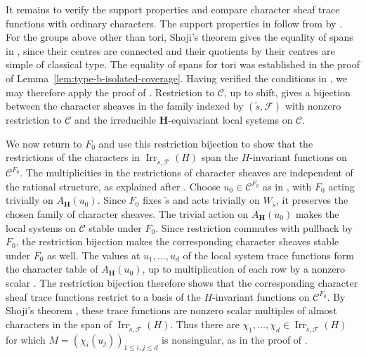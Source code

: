 \documentclass[10pt]{amsart}
\theoremstyle{definition}
\renewcommand{\leq}{\leqslant}
\let\oldendproof\endproof
\renewenvironment{proof}[1][\proofname]{%
  \oldproof[\bfseries #1]%
}{\oldendproof}
\DeclareMathOperator{\Irr}{Irr}
\numberwithin{equation}{section}
\numberwithin{table}{section}
\begin{document}
\begin{proof}[Proof of Lemma~\ref{lem:symplectic-gggr-selection}]
It remains to verify the support properties and compare character sheaf trace
functions with ordinary characters.
The support properties in \cite[(4.3)]{Geck1999GGGR} follow from
\cite[Theorem~10.7]{Lusztig1992Support} by
\cite[Corollary~13.6]{Taylor2016}.
For the groups above other than tori, Shoji's theorem
\cite[Theorem~3.2]{Shoji1995II} gives the equality of spans in
\cite[Theorem~7.1]{Geck1999GGGR}, since their centres are connected and
their quotients by their centres are simple of classical type.
The equality of spans for tori was established in the proof of
Lemma~\ref{lem:type-b-isolated-coverage}.
Having verified the conditions in \cite[(4.4)(a)--(b)]{Geck1999GGGR}, we may
therefore apply the proof of \cite[Theorem~4.5]{Geck1999GGGR}.
Restriction to $\mathcal C$, up to shift, gives a bijection between the
character sheaves in the family indexed by $(\widetilde s,\mathcal F)$
with nonzero restriction to $\mathcal C$ and the irreducible
$\mathbf H$-equivariant local systems on $\mathcal C$.

We now return to $F_0$ and use this restriction bijection to show that the
restrictions of the characters in $\Irr_{\widetilde s,\mathcal F}(H)$ span
the $H$-invariant functions on $\mathcal C^{F_0}$.
The multiplicities in the restrictions of character sheaves are independent
of the rational structure, as explained after
\cite[Theorem~4.5]{Geck1999GGGR}.
Choose $u_0\in\mathcal C^{F_0}$ as in \cite[Proposition~2.4]{Taylor2013},
with $F_0$ acting trivially on $A_{\mathbf H}(u_0)$.
Since $F_0$ fixes $\widetilde s$ and acts trivially on
$W_{\widetilde s}$, it preserves the chosen family of character sheaves.
The trivial action on $A_{\mathbf H}(u_0)$ makes the local systems on
$\mathcal C$ stable under $F_0$. Since restriction commutes with pullback
by $F_0$, the restriction bijection makes the corresponding character
sheaves stable under $F_0$ as well. The values at $u_1,\ldots,u_d$ of
the local system trace functions form the character table of
$A_{\mathbf H}(u_0)$, up to multiplication of each row by a nonzero scalar
\cite[Section~3(A)]{GeckMalle2000}. The restriction bijection therefore
shows that the corresponding character sheaf trace functions restrict to
a basis of the $H$-invariant functions on $\mathcal C^{F_0}$.
By Shoji's theorem \cite[Theorem~3.2]{Shoji1995II}, these trace functions
are nonzero scalar multiples of almost characters in the span of
$\Irr_{\widetilde s,\mathcal F}(H)$. Thus there are
$\chi_1,\ldots,\chi_d\in\Irr_{\widetilde s,\mathcal F}(H)$ for which
$M=(\chi_i(u_j))_{1\leq i,j\leq d}$ is nonsingular, as in the proof of
\cite[Corollary~3.5]{GeckHezard2008}.


\end{proof}
\end{document}
